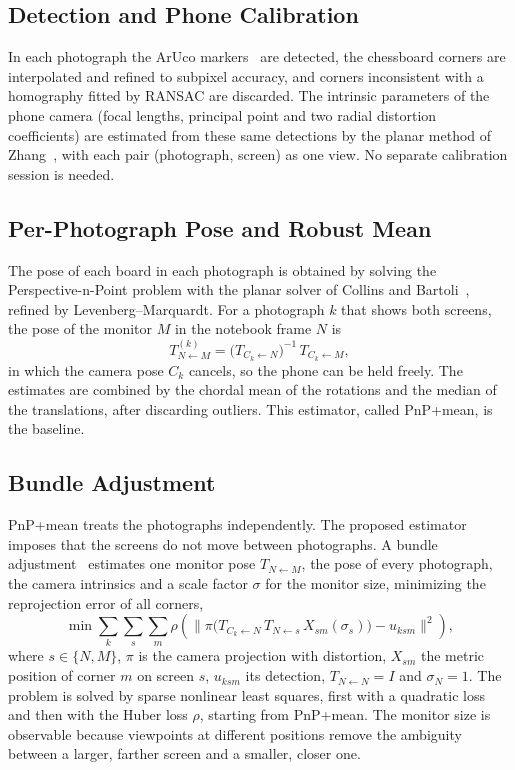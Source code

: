 \documentclass[english,hidelinks]{sbrt}
\begin{document}
\subsection{Detection and Phone Calibration}
In each photograph the ArUco markers~\cite{garrido2014automatic} are detected, the chessboard corners are interpolated and refined to subpixel accuracy, and corners inconsistent with a homography fitted by RANSAC are discarded. The intrinsic parameters of the phone camera (focal lengths, principal point and two radial distortion coefficients) are estimated from these same detections by the planar method of Zhang~\cite{zhang2000flexible}, with each pair (photograph, screen) as one view. No separate calibration session is needed.

\subsection{Per-Photograph Pose and Robust Mean}
The pose of each board in each photograph is obtained by solving the Perspective-n-Point problem with the planar solver of Collins and Bartoli~\cite{collins2014infinitesimal}, refined by Levenberg--Marquardt. For a photograph $k$ that shows both screens, the pose of the monitor $M$ in the notebook frame $N$ is
\begin{equation}
T^{(k)}_{N\leftarrow M} = \big(T_{C_k\leftarrow N}\big)^{-1}\,T_{C_k\leftarrow M},
\label{eq:pair}
\end{equation}
in which the camera pose $C_k$ cancels, so the phone can be held freely. The estimates are combined by the chordal mean of the rotations and the median of the translations, after discarding outliers. This estimator, called PnP+mean, is the baseline.

\subsection{Bundle Adjustment}
\label{sec:ba}
PnP+mean treats the photographs independently. The proposed estimator imposes that the screens do not move between photographs. A bundle adjustment~\cite{triggs2000bundle} estimates one monitor pose $T_{N\leftarrow M}$, the pose of every photograph, the camera intrinsics and a scale factor $\sigma$ for the monitor size, minimizing the reprojection error of all corners,
\begin{equation}
\min \sum_{k}\sum_{s}\sum_{m} \rho\!\left(\big\|\pi\big(T_{C_k\leftarrow N}\,T_{N\leftarrow s}\,X_{sm}(\sigma_s)\big)-u_{ksm}\big\|^2\right),
\label{eq:ba}
\end{equation}
where $s\in\{N,M\}$, $\pi$ is the camera projection with distortion, $X_{sm}$ the metric position of corner $m$ on screen $s$, $u_{ksm}$ its detection, $T_{N\leftarrow N}=I$ and $\sigma_N=1$. The problem is solved by sparse nonlinear least squares, first with a quadratic loss and then with the Huber loss $\rho$, starting from PnP+mean. The monitor size is observable because viewpoints at different positions remove the ambiguity between a larger, farther screen and a smaller, closer one.
\end{document}
